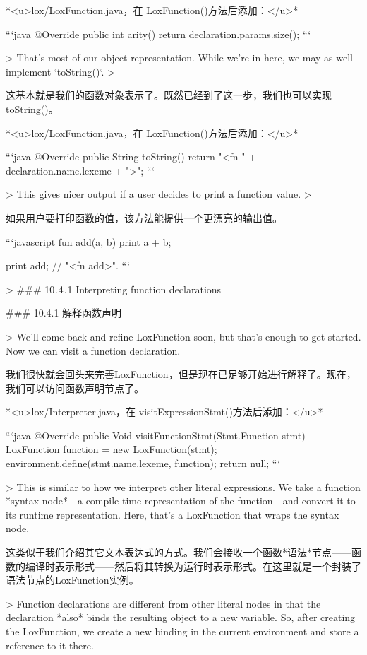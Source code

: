 \documentclass[cn,11pt,chinese]{elegantbook}
\begin{document}
{{{{{{{{*<u>lox/LoxFunction.java，在 LoxFunction()方法后添加：</u>*

```java
  @Override
  public int arity() {
    return declaration.params.size();
  }
```

> That’s most of our object representation. While we’re in here, we may as well implement `toString()`.
>

这基本就是我们的函数对象表示了。既然已经到了这一步，我们也可以实现toString()。

*<u>lox/LoxFunction.java，在 LoxFunction()方法后添加：</u>*

```java
  @Override
  public String toString() {
    return "<fn " + declaration.name.lexeme + ">";
  }
```

> This gives nicer output if a user decides to print a function value.
>

如果用户要打印函数的值，该方法能提供一个更漂亮的输出值。

```javascript
fun add(a, b) {
  print a + b;
}

print add; // "<fn add>".
```

> ### 10 . 4 . 1 Interpreting function declarations

### 10.4.1 解释函数声明

> We’ll come back and refine LoxFunction soon, but that’s enough to get started. Now we can visit a function declaration.

我们很快就会回头来完善LoxFunction，但是现在已足够开始进行解释了。现在，我们可以访问函数声明节点了。

*<u>lox/Interpreter.java，在 visitExpressionStmt()方法后添加：</u>*

```java
  @Override
  public Void visitFunctionStmt(Stmt.Function stmt) {
    LoxFunction function = new LoxFunction(stmt);
    environment.define(stmt.name.lexeme, function);
    return null;
  }
```

> This is similar to how we interpret other literal expressions. We take a function *syntax node*—a compile-time representation of the function—and convert it to its runtime representation. Here, that’s a LoxFunction that wraps the syntax node.

这类似于我们介绍其它文本表达式的方式。我们会接收一个函数*语法*节点——函数的编译时表示形式——然后将其转换为运行时表示形式。在这里就是一个封装了语法节点的LoxFunction实例。

> Function declarations are different from other literal nodes in that the declaration *also* binds the resulting object to a new variable. So, after creating the LoxFunction, we create a new binding in the current environment and store a reference to it there.

}}}}}}}}
\end{document}
